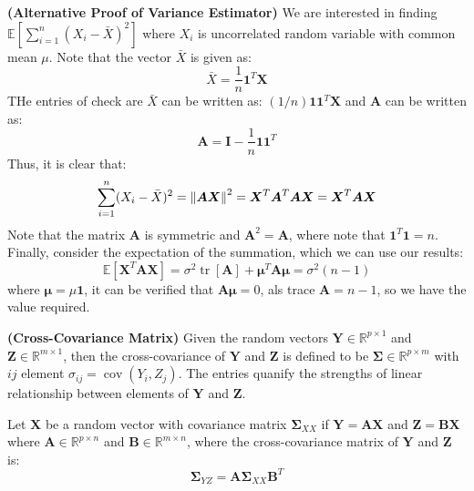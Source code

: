 \begin{remark}{\textbf{(Alternative Proof of Variance Estimator)}}
    We are interested in finding $\mathbb{E}[\sum^n_{i=1}(X_i-\bar{X})^2]$ where $X_i$ is uncorrelated random variable with common mean $\mu$. Note that the vector $\bar{X}$ is given as:
    \begin{equation*}
        \bar{X} = \frac{1}{n}\boldsymbol 1^T\boldsymbol X
    \end{equation*}
    THe entries of check are $\bar{X}$ can be written as: $(1/n)\boldsymbol 1\boldsymbol 1^T\boldsymbol X$ and $\boldsymbol A$ can be written as:
    \begin{equation*}
        \boldsymbol A = \boldsymbol I - \frac{1}{n}\boldsymbol 1\boldsymbol 1^T
    \end{equation*}
    Thus, it is clear that:
    \begin{equation*}
        \sum^n_{i=1}(X_i - \bar{X})^2 = \left\lVert\boldsymbol A\boldsymbol X\right\rVert^2 = \boldsymbol X^T\boldsymbol A^T\boldsymbol A\boldsymbol X = \boldsymbol X^T\boldsymbol A\boldsymbol X
    \end{equation*}
    Note that the matrix $\boldsymbol A$ is symmetric and $\boldsymbol A^2 = \boldsymbol A$, where note that $\boldsymbol 1^T\boldsymbol 1 = n$. Finally, consider the expectation of the summation, which we can use our results:
    \begin{equation*}
        \mathbb{E}[\boldsymbol X^T\boldsymbol A\boldsymbol X] = \sigma^2\operatorname{tr}[\boldsymbol A] + \boldsymbol \mu^T\boldsymbol A\boldsymbol \mu = \sigma^2(n-1)
    \end{equation*}
    where $\boldsymbol \mu = \mu \boldsymbol 1$, it can be verified that $\boldsymbol A\boldsymbol \mu = 0$, als trace $\boldsymbol A = n-1$, so we have the value required.
\end{remark}

\begin{definition}{\textbf{(Cross-Covariance Matrix)}}
    Given the random vectors $\boldsymbol Y \in \mathbb{R}^{p\times 1}$ and $\boldsymbol Z \in \mathbb{R}^{m\times 1}$, then the cross-covariance of $\boldsymbol Y$ and $\boldsymbol Z$ is defined to be $\boldsymbol \Sigma \in \mathbb{R}^{p\times m}$ with $ij$ element $\sigma_{ij} = \operatorname{cov}(Y_i, Z_j)$. The entries quanify the strengths of linear relationship between elements of $\boldsymbol Y$ and $\boldsymbol Z$. 
\end{definition}

\begin{proposition}
    Let $\boldsymbol X$ be a random vector with covariance matrix $\boldsymbol \Sigma_{XX}$ if $\boldsymbol Y = \boldsymbol A\boldsymbol X$ and $\boldsymbol Z = \boldsymbol B\boldsymbol X$ where $\boldsymbol A \in \mathbb{R}^{p\times n}$ and $\boldsymbol B\in \mathbb{R}^{m\times n}$, where the cross-covariance matrix of $\boldsymbol Y$ and $\boldsymbol Z$ is:
    \begin{equation*}
        \boldsymbol \Sigma_{YZ} = \boldsymbol A\boldsymbol \Sigma_{XX}\boldsymbol B^T
    \end{equation*}
\end{proposition}

